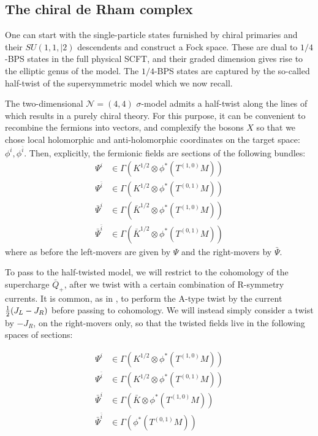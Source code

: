 \documentclass[11pt]{amsart}
\newcommand{\cN}{\mathcal{N}}
\theoremstyle{thm}
\numberwithin{equation}{subsection}
\theoremstyle{def}
\theoremstyle{rem}
\begin{document}
\subsection{The chiral de Rham complex} 

One can start with the single-particle states furnished by chiral primaries and their $SU(1,1,|2)$ descendents and construct a Fock space. 
These are dual to $1/4$-BPS states in the full physical SCFT, and their graded dimension gives rise to the elliptic genus of the model.
The $1/4$-BPS states are captured by the so-called half-twist of the supersymmetric model which we now recall.

The two-dimensional $\cN=(4,4)$ $\sigma$-model admits a half-twist along the lines of \cite{Kapustin, Witten} which results in a purely chiral theory.
For this purpose, it can be convenient to recombine the fermions into vectors, and complexify the bosons $X$ so that we chose local holomorphic and anti-holomorphic coordinates on the target space: $\phi^i, \phi^{\bar{i}}$. 
Then, explicitly, the fermionic fields are sections of the following bundles: 
\begin{align*}
\Psi^i &\in \Gamma(K^{1/2}\otimes \phi^*(T^{(1,0)}M))\\
\Psi^{\bar{i}}&\in \Gamma(K^{1/2}\otimes \phi^*(T^{(0,1)}M))\\
\bar{\Psi}^{i} &\in \Gamma(\bar{K}^{1/2}\otimes \phi^*(T^{(1,0)}M))\\
\bar{\Psi}^{\bar{i}} &\in \Gamma(\bar{K}^{1/2}\otimes \phi^*(T^{(0,1)}M))
\end{align*}  
where as before the left-movers are given by $\Psi$ and the right-movers by $\bar{\Psi}$.

To pass to the half-twisted model, we will restrict to the cohomology of the supercharge $\bar{Q}_+$, after we twist with a certain combination of R-symmetry currents. It is common, as in  \cite{Kapustin}, to perform the A-type twist by the current ${1 \over 2}(J_L - J_R)$ before passing to cohomology. We will instead simply consider a twist by $-J_R$, on the right-movers only, so that the twisted fields live in the following spaces of sections:

\begin{align*}
\Psi^i &\in \Gamma(K^{1/2}\otimes \phi^*(T^{(1,0)}M))\\
\Psi^{\bar{i}} &\in \Gamma(K^{1/2}\otimes \phi^*(T^{(0,1)}M))\\
\bar{\Psi}^i &\in \Gamma(\bar{K} \otimes\phi^*(T^{(1,0)}M))\\
\bar{\Psi}^{\bar{i}} &\in  \Gamma(\phi^*(T^{(0,1)}M))
\end{align*} 
\end{document}
